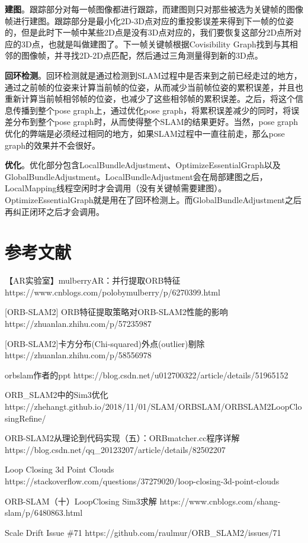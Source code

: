 \textbf{建图}。跟踪部分对每一帧图像都进行跟踪，而建图则只对那些被选为关键帧的图像帧进行建图。跟踪部分是最小化2D-3D点对应的重投影误差来得到下一帧的位姿的，但是此时下一帧中某些2D点是没有3D点对应的，我们要恢复这部分2D点所对应的3D点，也就是叫做建图了。下一帧关键帧根据Covisibility Graph找到与其相邻的图像帧，并寻找2D-2D点匹配，然后通过三角测量得到新的3D点。

\textbf{回环检测}。回环检测就是通过检测到SLAM过程中是否来到之前已经走过的地方，通过之前帧的位姿来计算当前帧的位姿，从而减少当前帧位姿的累积误差，并且也重新计算当前帧相邻帧的位姿，也减少了这些相邻帧的累积误差。之后，将这个信息传播到整个pose graph上，通过优化pose graph，将累积误差减少的同时，将误差分布到整个pose graph时，从而使得整个SLAM的结果更好。当然，pose graph优化的弊端是必须经过相同的地方，如果SLAM过程中一直往前走，那么pose graph的效果并不会很好。

\textbf{优化}。优化部分包含LocalBundleAdjustment、OptimizeEssentialGraph以及GlobalBundleAdjustment。LocalBundleAdjustment会在局部建图之后，LocalMapping线程空闲时才会调用（没有关键帧需要建图）。OptimizeEssentialGraph就是用在了回环检测上。而GlobalBundleAdjustment之后再纠正闭环之后才会调用。



\section{参考文献}

【AR实验室】mulberryAR：并行提取ORB特征
https://www.cnblogs.com/polobymulberry/p/6270399.html


[ORB-SLAM2] ORB特征提取策略对ORB-SLAM2性能的影响
https://zhuanlan.zhihu.com/p/57235987


[ORB-SLAM2]卡方分布(Chi-squared)外点(outlier)剔除
https://zhuanlan.zhihu.com/p/58556978

orbslam作者的ppt
https://blog.csdn.net/u012700322/article/details/51965152

ORB\_SLAM2中的Sim3优化
https://zhehangt.github.io/2018/11/01/SLAM/ORBSLAM/ORBSLAM2LoopClosingRefine/


ORB-SLAM2从理论到代码实现（五）：ORBmatcher.cc程序详解
https://blog.csdn.net/qq\_20123207/article/details/82502207

Loop Closing 3d Point Clouds
https://stackoverflow.com/questions/37279020/loop-closing-3d-point-clouds


ORB-SLAM（十）LoopClosing Sim3求解
https://www.cnblogs.com/shang-slam/p/6480863.html


Scale Drift Issue \#71
https://github.com/raulmur/ORB\_SLAM2/issues/71


